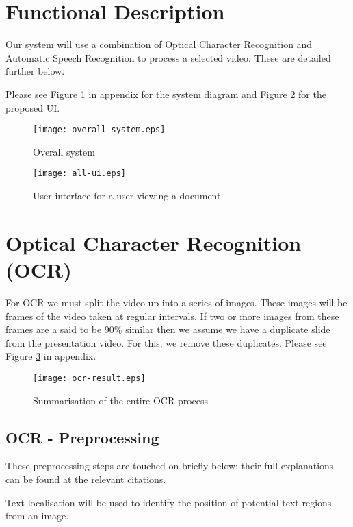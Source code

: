 \documentclass[a4paper,12pt]{article}
\begin{document}
\section{Functional Description}
Our system will use a combination of Optical Character Recognition and Automatic Speech Recognition to process a selected video. These are detailed further below.

Please see Figure \ref{fig:system-diagram} in appendix for the system diagram and Figure \ref{fig:ui-diagram} for the proposed UI.

\begin{figure}[h]
\centering
\texttt{[image: overall-system.eps]}
\caption{Overall system}
\label{fig:system-diagram}
\end{figure}

\begin{figure}[ht]
\centering
\texttt{[image: all-ui.eps]}
\caption{User interface for a user viewing a document}
\label{fig:ui-diagram}
\end{figure}

\section{Optical Character Recognition (OCR)}
For OCR we must split the video up into a series of images. These images will be frames of the video taken at regular intervals. If two or more images from these frames are a said to be 90\% similar then we assume we have a duplicate slide from the presentation video. For this, we remove these duplicates. Please see Figure \ref{fig:ocr-proc} in appendix.

\begin{figure}[ht]
\centering
\texttt{[image: ocr-result.eps]}
\caption{Summarisation of the entire OCR process}
\label{fig:ocr-proc}
\end{figure}

\subsection{OCR - Preprocessing}
These preprocessing steps are touched on briefly below; their full explanations can be found at the relevant citations.

Text localisation will be used to identify the position of potential text regions from an image.
\end{document}
